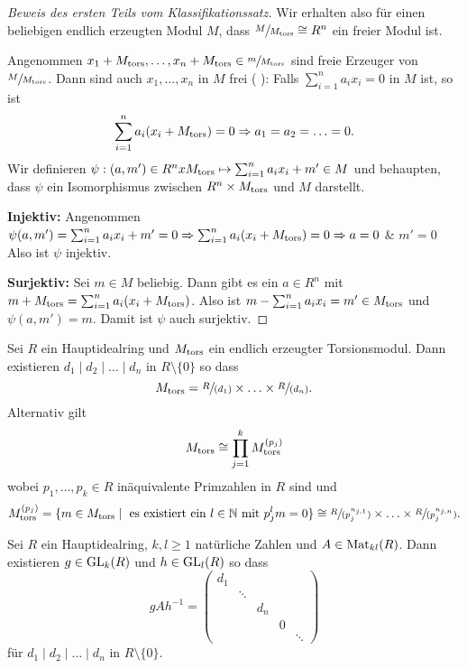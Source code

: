\begin{proof}[Beweis des ersten Teils vom Klassifikationssatz]
	Wir erhalten also für einen beliebigen endlich erzeugten Modul $M$, dass $\sfrac{M}{M_{\operatorname{tors}}} \cong R^{n}$ ein freier Modul ist.

	Angenommen $x_1 + M_{\operatorname{tors}}, \ldots, x_{n} + M_{\operatorname{tors}} \in \sfrac{m}{M_{\operatorname{tors}}}$ sind freie Erzeuger von $\sfrac{M}{M_{\operatorname{tors}}}$.
	Dann sind auch $x_1,\ldots,x_{n}$ in $M$ frei (%
	): Falls $\sum_{i=1}^{n} a_{i} x_{i} = 0$ in $M$ ist, so ist
	\[
		\sum_{i=1}^{n} a_{i} (x_{i} + M_{\operatorname{tors}}) = 0 \Rightarrow a_1 = a_2 = \ldots = 0
	.\] 
	Wir definieren $\psi: (a,m') \in R^{n} x M_{\operatorname{tors}} \mapsto  \sum_{i=1}^{n} a_{i} x_{i} + m' \in M$ und behaupten,
	dass $\psi$ ein Isomorphismus zwischen $R^{n} \times M_{\operatorname{tors}}$ und $M$ darstellt.

	\textbf{Injektiv:} Angenommen $\psi(a,m') = \sum_{i=1}^{n} a_{i} x_{i} + m' = 0 \Rightarrow \sum_{i=1}^{n} a_{i} (x_{i} + M_{\operatorname{tors}}) = 0 \Rightarrow a = 0$ \& $m' = 0$ 
	Also ist $\psi$ injektiv.

	\textbf{Surjektiv:} Sei $m \in M$ beliebig. Dann gibt es ein $a \in R^{n}$ mit $m + M_{\operatorname{tors}} = \sum_{i=1}^{n} a_{i} (x_{i} + M_{\operatorname{tors}})$.
	Also ist $m - \sum_{i = 1}^{n} a_{i} x_{i} = m' \in M_{\operatorname{tors}}$ und $\psi(a,m') = m$.
	Damit ist $\psi$ auch surjektiv.
\end{proof}

\begin{theorem}
	Sei $R$ ein Hauptidealring und $M_{\operatorname{tors}}$ ein endlich erzeugter Torsionsmodul. 
	Dann existieren $d_1 \mid d_2 \mid \ldots \mid d_{n}$ in $R \setminus \{0\} $ so dass
	\[
		M_{\operatorname{tors}} = \sfrac{R}{(d_1)} \times \ldots \times \sfrac{R}{(d_{n})}
	.\] 
	Alternativ gilt
	\[
		M_{\operatorname{tors}} \cong \prod_{j=1}^{k} M_{\operatorname{tors}}^{(p_{j})}
	\]
	wobei $p_1,\ldots,p_{k} \in R$ inäquivalente Primzahlen in $R$ sind und
	\[
		M_{\operatorname{tors}}^{(p_{j})} = \{m \in M_{\operatorname{tors}} \mid \text{ es existiert ein $l \in \mathbb{N}$ mit } p_{j}^{l} m = 0\} \cong 
		\sfrac{R}{(p_{j}^{n_{j,1}})} \times \ldots \times \sfrac{R}{(p_{j}^{n_{j,n}})}
	.\] 
\end{theorem}

\begin{theorem}
	Sei $R$ ein Hauptidealring, $k,l \geq 1$ natürliche Zahlen und $A \in \operatorname{Mat}_{kl}(R)$.
	Dann existieren $g \in \operatorname{GL}_{k}(R)$ und $h \in \operatorname{GL}_{l}(R)$ so dass
	\[
	g A h^{-1} = \begin{pmatrix} 
		d_1 \\
		& \ddots \\
		& & d_{n} \\
		& & & 0 \\
		& & & & \ddots
	\end{pmatrix} 
	\]
	für $d_1 \mid d_2 \mid \ldots \mid d_{n}$ in $R \setminus \{0\} $.
\end{theorem}

